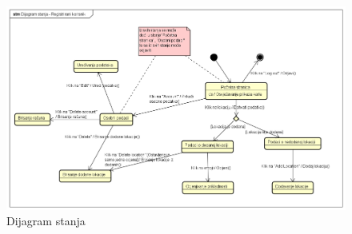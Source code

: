			\begin{figure}[H]
			\includegraphics[scale=0.2]{slike/DijagramStanja.png}
			\centering
			\caption{Dijagram stanja}
			\label{fig:promjene}
				\end{figure}
			
			
			
			
		
			
			
			
			
			
		
			
			
			
		
		
